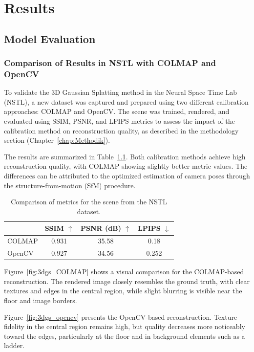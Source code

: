 \chapter{Results}


\section{Model Evaluation}


\subsection{Comparison of Results in NSTL with COLMAP and OpenCV}

To validate the 3D Gaussian Splatting method in the Neural Space Time Lab (NSTL), a new dataset was captured and prepared using two different calibration approaches: COLMAP and OpenCV. 
The scene was trained, rendered, and evaluated using SSIM, PSNR, and LPIPS metrics to assess the impact of the calibration method on reconstruction quality, as described in the methodology section (Chapter~\ref{chap:Methodik}).

The results are summarized in Table~\ref{tab:3dgs_results_nstl}. 
Both calibration methods achieve high reconstruction quality, with COLMAP showing slightly better metric values. 
The differences can be attributed to the optimized estimation of camera poses through the structure-from-motion (SfM) procedure.

\begin{table}[h]
\centering
\caption{Comparison of metrics for the scene from the NSTL dataset.}
\label{tab:3dgs_results_nstl}
\begin{tabular}{lccc}
\toprule
& SSIM $\uparrow$ & PSNR (dB) $\uparrow$ & LPIPS $\downarrow$\\
\midrule
COLMAP & 0.931 & 35.58 & 0.18 \\
OpenCV & 0.927 & 34.56 & 0.252\\
\bottomrule
\end{tabular}
\end{table}

Figure~\ref{fig:3dgs_COLMAP} shows a visual comparison for the COLMAP-based reconstruction. 
The rendered image closely resembles the ground truth, with clear textures and edges in the central region, while slight blurring is visible near the floor and image borders.

Figure~\ref{fig:3dgs_opencv} presents the OpenCV-based reconstruction. 
Texture fidelity in the central region remains high, but quality decreases more noticeably toward the edges, particularly at the floor and in background elements such as a ladder.

